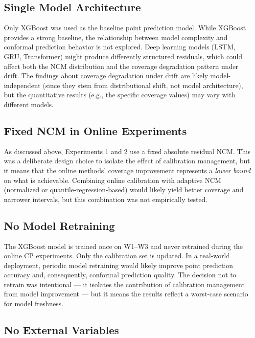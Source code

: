 \subsection{Single Model Architecture}

Only XGBoost was used as the baseline point prediction model. While XGBoost provides a strong baseline, the relationship between model complexity and conformal prediction behavior is not explored. Deep learning models (LSTM, GRU, Transformer) might produce differently structured residuals, which could affect both the NCM distribution and the coverage degradation pattern under drift. The findings about coverage degradation under drift are likely model-independent (since they stem from distributional shift, not model architecture), but the quantitative results (e.g., the specific coverage values) may vary with different models.

\subsection{Fixed NCM in Online Experiments}

As discussed above, Experiments 1 and 2 use a fixed absolute residual NCM. This was a deliberate design choice to isolate the effect of calibration management, but it means that the online methods' coverage improvement represents a \emph{lower bound} on what is achievable. Combining online calibration with adaptive NCM (normalized or quantile-regression-based) would likely yield better coverage and narrower intervals, but this combination was not empirically tested.

\subsection{No Model Retraining}

The XGBoost model is trained once on W1--W3 and never retrained during the online CP experiments. Only the calibration set is updated. In a real-world deployment, periodic model retraining would likely improve point prediction accuracy and, consequently, conformal prediction quality. The decision not to retrain was intentional — it isolates the contribution of calibration management from model improvement — but it means the results reflect a worst-case scenario for model freshness.

\subsection{No External Variables}

